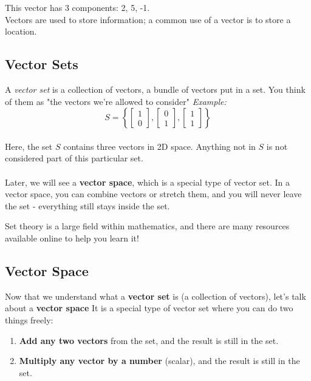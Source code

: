\documentclass[12pt]{report}
\begin{document}
        This vector has 3 components: 2, 5, -1. \\
        Vectors are used to store information; a common use of a vector is to store a location.

        \subsection{Vector Sets}
            A \emph{vector set} is a collection of vectors, a bundle of vectors put in a set. You think of them as "the vectors we're allowed to consider"
            \emph{Example:} 
            \begin{equation}
                S = \left\{ 
                    \begin{bmatrix}1\\0\end{bmatrix}, 
                    \begin{bmatrix}0\\1\end{bmatrix}, 
                    \begin{bmatrix}1\\1\end{bmatrix} 
                    \right\}
            \end{equation}
            \\
            Here, the set $S$ contains three vectors in 2D space. Anything not in $S$ is not considered part of this particular set. 
            \\\\
            Later, we will see a \textbf{vector space}, which is a special type of vector set. In a vector space, you can combine vectors or stretch them, and you will never leave the set - everything still stays inside the set.

            Set theory is a large field within mathematics, and there are many resources available online to help you learn it!

        \subsection{Vector Space}
            Now that we understand what a \textbf{vector set} is (a collection of vectors), let's talk about a \textbf{vector space} It is a special type of vector set where you can do two things freely:

            \begin{enumerate}
                \item \textbf{Add any two vectors} from the set, and the result is still in the set.
                \item \textbf{Multiply any vector by a number} (scalar), and the result is still in the set.
            \end{enumerate}
\end{document}

